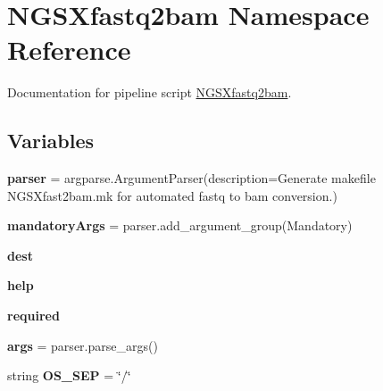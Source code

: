 \hypertarget{namespaceNGSXfastq2bam}{}\section{N\+G\+S\+Xfastq2bam Namespace Reference}
\label{namespaceNGSXfastq2bam}


Documentation for pipeline script \hyperlink{namespaceNGSXfastq2bam}{N\+G\+S\+Xfastq2bam}.  


\subsection*{Variables}
\begin{DoxyCompactItemize}
\item 
{\bfseries parser} = argparse.\+Argument\+Parser(description=\textquotesingle{}Generate makefile N\+G\+S\+Xfast2bam.\+mk for automated fastq to bam conversion.\textquotesingle{})\hypertarget{namespaceNGSXfastq2bam_addb5c4af5f06e4ec9a061a8d1209144e}{}\label{namespaceNGSXfastq2bam_addb5c4af5f06e4ec9a061a8d1209144e}

\item 
{\bfseries mandatory\+Args} = parser.\+add\+\_\+argument\+\_\+group(\textquotesingle{}Mandatory\textquotesingle{})\hypertarget{namespaceNGSXfastq2bam_a6c8da8bb3536fa83a28ba03231d554fc}{}\label{namespaceNGSXfastq2bam_a6c8da8bb3536fa83a28ba03231d554fc}

\item 
{\bfseries dest}\hypertarget{namespaceNGSXfastq2bam_a717910b3732ae88d1bd99e7309f3b73f}{}\label{namespaceNGSXfastq2bam_a717910b3732ae88d1bd99e7309f3b73f}

\item 
{\bfseries help}\hypertarget{namespaceNGSXfastq2bam_a3c2285a7cb3279303fd148294091c7b7}{}\label{namespaceNGSXfastq2bam_a3c2285a7cb3279303fd148294091c7b7}

\item 
{\bfseries required}\hypertarget{namespaceNGSXfastq2bam_a7c0ee14a14766a3e3e9e68f879375816}{}\label{namespaceNGSXfastq2bam_a7c0ee14a14766a3e3e9e68f879375816}

\item 
{\bfseries args} = parser.\+parse\+\_\+args()\hypertarget{namespaceNGSXfastq2bam_a5b6763c65a69a6bf9e4ee3c7e3057518}{}\label{namespaceNGSXfastq2bam_a5b6763c65a69a6bf9e4ee3c7e3057518}

\item 
string {\bfseries O\+S\+\_\+\+S\+EP} = \char`\"{}/\char`\"{}\hypertarget{namespaceNGSXfastq2bam_a3e01301489dec48562661060a9a9b409}{}\label{namespaceNGSXfastq2bam_a3e01301489dec48562661060a9a9b409}


\end{DoxyCompactItemize}

